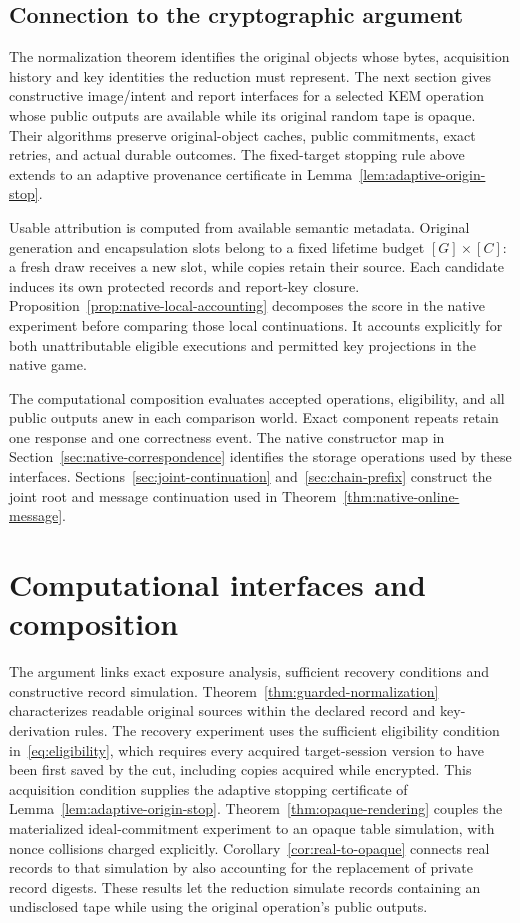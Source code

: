 \documentclass[pdflatex]{sn-jnl}
\theoremstyle{thmstyleone}
\theoremstyle{thmstylethree}
\theoremstyle{thmstyletwo}
\begin{document}
\subsection{Connection to the cryptographic argument}

The normalization theorem identifies the original objects whose bytes,
acquisition history and key identities the reduction must represent. The
next section gives constructive image/intent and report interfaces for a selected KEM operation
whose public outputs are available while its original random tape is opaque.
Their algorithms preserve original-object caches, public commitments, exact
retries, and actual durable outcomes. The fixed-target stopping rule above
extends to an adaptive provenance certificate in
Lemma~\ref{lem:adaptive-origin-stop}.

Usable attribution is computed from available semantic metadata. Original
generation and encapsulation slots belong to a fixed lifetime budget
$[G]\times[C]$: a fresh draw receives a new slot, while copies retain their
source. Each candidate induces its own protected records and report-key
closure. Proposition~\ref{prop:native-local-accounting} decomposes the score
in the native experiment before comparing those local continuations. It
accounts explicitly for both unattributable eligible executions and permitted
key projections in the native game.

The computational composition evaluates accepted operations, eligibility, and
all public outputs anew in each comparison world. Exact component repeats
retain one response and one correctness event. The native constructor map in
Section~\ref{sec:native-correspondence} identifies the storage operations used
by these interfaces. Sections~\ref{sec:joint-continuation}
and~\ref{sec:chain-prefix} construct the joint root and message
continuation used in Theorem~\ref{thm:native-online-message}.
\section{Computational interfaces and composition}
\label{sec:computation}

The argument links exact exposure analysis, sufficient recovery conditions
and constructive record simulation. Theorem~\ref{thm:guarded-normalization}
characterizes readable original sources within the declared record and
key-derivation rules. The recovery experiment uses the sufficient eligibility
condition in~\eqref{eq:eligibility}, which requires every acquired
target-session version to have been first saved by the cut, including copies
acquired while encrypted. This acquisition condition supplies the adaptive
stopping certificate of Lemma~\ref{lem:adaptive-origin-stop}.
Theorem~\ref{thm:opaque-rendering} couples the materialized
ideal-commitment experiment to an opaque table simulation, with nonce
collisions charged explicitly. Corollary~\ref{cor:real-to-opaque} connects
real records to that simulation by also accounting for the replacement of
private record digests. These results let the reduction simulate records
containing an undisclosed tape while using the original operation's public
outputs.
\end{document}
